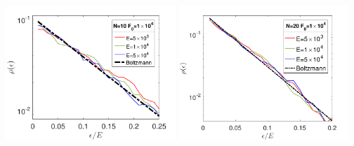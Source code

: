\documentclass{minimal}
\begin{document}
\includegraphics[width=0.48\textwidth]{boltzmann_N=10_F=10000_500_400_Font16_lg.pdf}
\includegraphics[width=0.48\textwidth]{boltzmann_N=20_F=10000_500_400_Font16_lg.pdf} 
\end{document}
